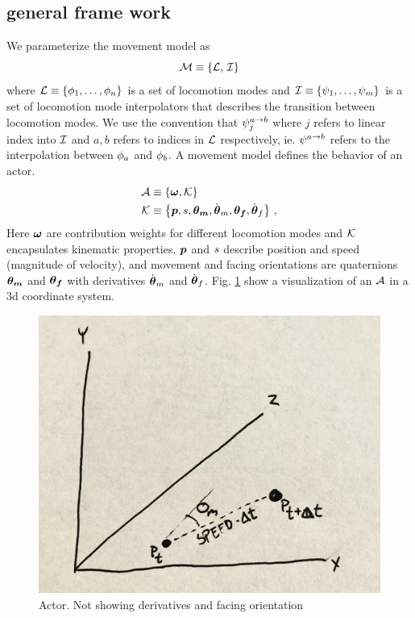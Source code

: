 \subsection{general frame work}
We parameterize the movement model as 
\begin{equation}
    \label{eq:model:parameterization}
 \mathcal{M} \equiv 
 \left\{ \mathcal{L},\,\mathcal{I} \right\}
\end{equation}
where $\mathcal{L} \equiv \left\{  \phi_1, \ldots, \phi_n \right\}$ is a set of locomotion modes and $\mathcal{I} \equiv \left\{  \psi_1, \ldots, \psi_m \right\}$ is a set of locomotion mode interpolators that describes the transition between locomotion modes. We use the convention that $\psi_j^{a\rightarrow b}$ where $j$ refers to linear index into $\mathcal{I}$ and $a,b$ refers to indices in $\mathcal{L}$ respectively, ie. $\psi^{a\rightarrow b}$ refers to the interpolation between $\phi_a$ and $\phi_b$. A movement model defines the behavior of an actor. 
\begin{subequations}
\begin{align}
    \label{eq:actor:def}
    \mathcal{A} 
    &\equiv
    \left\{ 
        \boldsymbol{\omega }, \mathcal{K} 
         \right\}\\
    \mathcal{K}
    &\equiv
    \left\{ 
        \boldsymbol{p }, s, \boldsymbol{\theta_m }, \dot{\boldsymbol{\theta }}_m, {\boldsymbol{\theta_f }}, \dot{\boldsymbol{\theta }}_f 
         \right\}\,,
\end{align}
\end{subequations}
Here $\boldsymbol{\omega }$ are contribution weights for different locomotion modes and $\mathcal{K}$ encapsulates kinematic properties. $\boldsymbol{p }$ and $s$ describe position and speed (magnitude of velocity), and movement and facing orientations are quaternions $\boldsymbol{\theta_m }$ and ${\boldsymbol{\theta_f }}$ with derivatives $\dot{\boldsymbol{\theta }}_m$ and $\dot{\boldsymbol{\theta }}_f$. Fig. \ref{fig:actor} show a visualization of an $\mathcal{A}$ in a 3d coordinate system.  
\begin{figure}
    \centering
    \includegraphics[width=0.75\columnwidth]{img/actor.jpg}
    \caption{Actor. Not showing derivatives and facing orientation}
    \label{fig:actor}
\end{figure}
